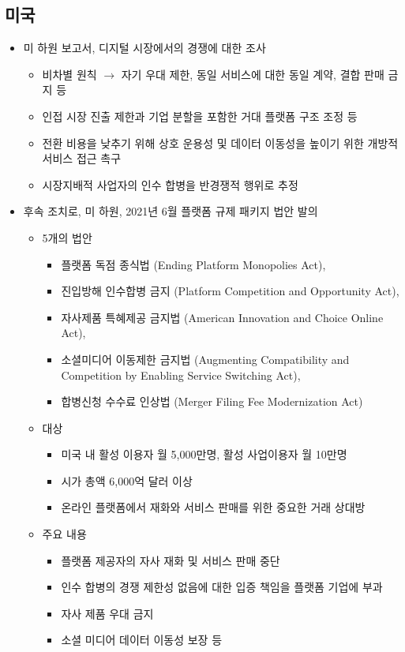 \subsection{미국}
\begin{itemize}
\item 미 하원 보고서, 디지털 시장에서의 경쟁에 대한 조사 \citep{Subcommittee-on-Antitrust-Commercial-and-Administrative-Law:2020aa,gimhyeonsu-gang-ingyu:2021aa}
	\begin{itemize}
	\item 비차별 원칙 $\rightarrow$ 자기 우대 제한, 동일 서비스에 대한 동일 계약, 결합 판매 금지 등
	\item 인접 시장 진출 제한과 기업 분할을 포함한 거대 플랫폼 구조 조정 등
	\item 전환 비용을 낮추기 위해 상호 운용성 및 데이터 이동성을 높이기 위한 개방적 서비스 접근 촉구
	\item 시장지배적 사업자의 인수 합병을 반경쟁적 행위로 추정
	\end{itemize}
\item 후속 조치로, 미 하원, 2021년 6월 플랫폼 규제 패키지 법안 발의
	\begin{itemize}
	\item 5개의 법안
		\begin{itemize}
		\item 플랫폼 독점 종식법 (Ending Platform Monopolies Act), 
		\item 진입방해 인수합병 금지 (Platform Competition and Opportunity Act),
		\item 자사제품 특혜제공 금지법 (American  Innovation and Choice Online Act),
		\item 소셜미디어 이동제한 금지법 (Augmenting Compatibility and Competition by Enabling Service Switching Act), 
		\item 합병신청 수수료 인상법 (Merger Filing Fee Modernization Act)
		\end{itemize}
	\item 대상
		\begin{itemize}
		\item 미국 내 활성 이용자 월 5,000만명, 활성 사업이용자 월 10만명
		\item 시가 총액 6,000억 달러 이상
		\item 온라인 플랫폼에서 재화와 서비스 판매를 위한 중요한 거래 상대방
		\end{itemize}
	\item 주요 내용
		\begin{itemize}
		\item 플랫폼 제공자의 자사 재화 및 서비스 판매 중단
		\item 인수 합병의 경쟁 제한성 없음에 대한 입증 책임을 플랫폼 기업에 부과
		\item 자사 제품 우대 금지
		\item 소셜 미디어 데이터 이동성 보장 등
		\end{itemize}
	\end{itemize}
\end{itemize}

